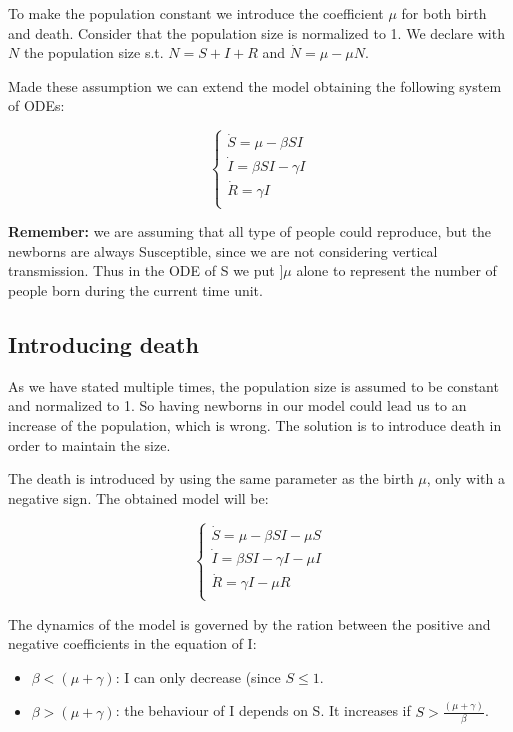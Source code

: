 To make the population constant we introduce the coefficient $\mu$ for both birth and death. Consider that the population size is normalized to 1. We declare with $N$ the population size s.t. $N = S + I + R$ and $\dot{N} = \mu - \mu N$.

Made these assumption we can extend the model obtaining the following system of ODEs:

\[
\begin{cases}
        \dot{S} = \mu - \beta S I \\
        \dot{I} = \beta S I - \gamma I\\
        \dot{R} = \gamma I\\
\end{cases}
\]

\textbf{Remember:} we are assuming that all type of people could reproduce, but the newborns are always Susceptible, since we are not considering vertical transmission. Thus in the ODE of S we put $]\mu$ alone to represent the number of people born during the current time unit.

\subsection{Introducing death}
As we have stated multiple times, the population size is assumed to be constant and normalized to 1. So having newborns in our model could lead us to an increase of the population, which is wrong. The solution is to introduce death in order to maintain the size. \par
The death is introduced by using the same parameter as the birth $\mu$, only with a negative sign. The obtained model will be:

\[
\begin{cases}
        \dot{S} = \mu - \beta S I - \mu S \\
        \dot{I} = \beta S I - \gamma I - \mu I\\
        \dot{R} = \gamma I - \mu R\\
\end{cases}
\]

The dynamics of the model is governed by the ration between the positive and negative coefficients in the equation of I:

\begin{itemize}
    \item $\beta < (\mu + \gamma)$: I can only decrease (since $S \leq 1$.
    \item $\beta > (\mu + \gamma)$: the behaviour of I depends on S. It increases if $S > \frac{(\mu + \gamma)}{\beta}$.
\end{itemize}

